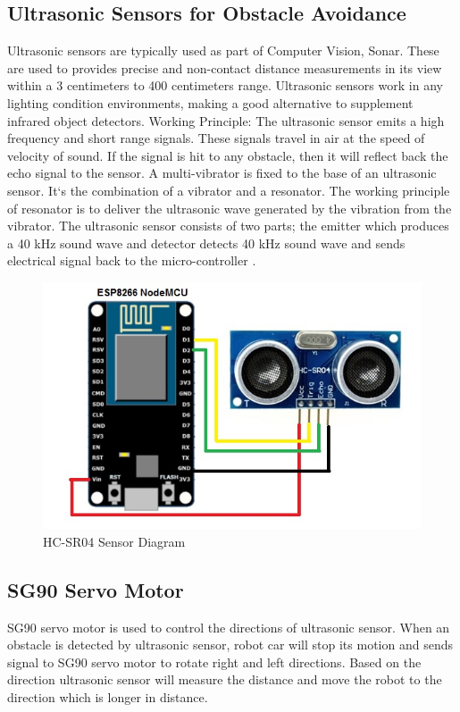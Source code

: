\documentclass[sigconf]{acmart}
\begin{document}
\subsection{Ultrasonic Sensors for Obstacle Avoidance}
Ultrasonic sensors are typically used as part of Computer Vision, Sonar. These are used to provides precise and non-contact distance measurements in its view within a 3 centimeters to 400 centimeters range. Ultrasonic sensors work in any lighting condition environments, making a good alternative to supplement infrared object detectors.
Working Principle: The ultrasonic sensor emits a high frequency and short range signals. These signals travel in air at the speed of velocity of sound. If the signal is hit to any obstacle, then it will reflect back the echo signal to the sensor. A multi-vibrator is fixed to the base of an ultrasonic sensor. It`s the combination of a vibrator and a resonator. The working principle of resonator is to  deliver the  ultrasonic wave generated by the vibration from the vibrator. The ultrasonic sensor consists of two parts; the emitter which produces a 40 kHz sound wave and detector detects 40 kHz sound wave and sends electrical signal back to the micro-controller \cite{ijedr2016}.
\begin{figure}
	\includegraphics[width=1.0\columnwidth]{images/Ultrasonic-sensor.jpg}
	\caption{HC-SR04 Sensor Diagram}
\end{figure}

\subsection{SG90 Servo Motor}
SG90 servo motor is used to control the directions of ultrasonic sensor. When an obstacle is detected by ultrasonic sensor, robot car will stop its motion and sends signal to SG90 servo motor to rotate right and left directions. Based on the direction ultrasonic sensor will measure the distance and move the robot to the direction which is longer in distance.
\end{document}

